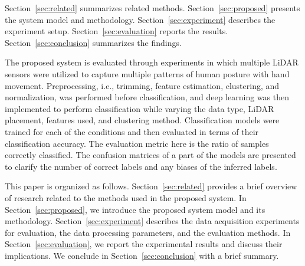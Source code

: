 Section~\ref{sec:related} summarizes related methods.
Section~\ref{sec:proposed} presents the system model and methodology.
Section~\ref{sec:experiment} describes the experiment setup.
Section~\ref{sec:evaluation} reports the results.
Section~\ref{sec:conclusion} summarizes the findings.
\begin{deletedblock}
The proposed system is evaluated through experiments in which multiple LiDAR sensors were utilized to capture multiple patterns of human posture with hand movement.
    Preprocessing, i.e., trimming, feature estimation, clustering, and normalization, was performed before classification, and deep learning was then implemented to perform classification while varying the data type, LiDAR placement, features used, and clustering method.
    Classification models were trained for each of the conditions and then evaluated in terms of their classification accuracy.
The evaluation metric here is the ratio of samples correctly classified. 
The confusion matrices of a part of the models are presented to clarify the number of correct labels and any biases of the inferred labels.
\end{deletedblock}

\begin{deletedblock}
This paper is organized as follows. Section~\ref{sec:related} provides a brief overview of research related to the methods used in the proposed system. 
In Section~\ref{sec:proposed}, we introduce the proposed system model and its methodology. 
Section~\ref{sec:experiment} describes the data acquisition experiments for evaluation, the data processing parameters, and the evaluation methods. 
In Section~\ref{sec:evaluation}, we report the experimental results and discuss their implications. 
We conclude in Section~\ref{sec:conclusion} with a brief summary.
\end{deletedblock}